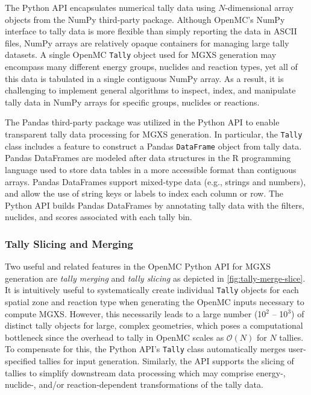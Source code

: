 
The Python API encapsulates numerical tally data using $N$-dimensional array objects from the NumPy third-party package\cite{walt2011numpy}. Although OpenMC's NumPy interface to tally data is more flexible than simply reporting the data in ASCII files, NumPy arrays are relatively opaque containers for managing large tally datasets. A single OpenMC \texttt{Tally} object used for MGXS generation may encompass many different energy groups, nuclides and reaction types, yet all of this data is tabulated in a single contiguous NumPy array. As a result, it is challenging to implement general algorithms to inspect, index, and manipulate tally data in NumPy arrays for specific groups, nuclides or reactions.

The Pandas third-party package\cite{mckinney2010pandas} was utilized in the Python API to enable transparent tally data processing for MGXS generation. In particular, the \texttt{Tally} class includes a feature to construct a Pandas \texttt{DataFrame} object from tally data. Pandas DataFrames are modeled after data structures in the \textsf{R} programming language used to store data tables in a more accessible format than contiguous arrays. Pandas DataFrames support mixed-type data (e.g., strings and numbers), and allow the use of string keys or labels to index each column or row. The Python API builds Pandas DataFrames by annotating tally data with the filters, nuclides, and scores associated with each tally bin.

\subsubsection{Tally Slicing and Merging}
\label{subsubsec:tally-slice-merge}

Two useful and related features in the OpenMC Python API for MGXS generation are \textit{tally merging} and \textit{tally slicing} as depicted in \cref{fig:tally-merge-slice}. It is intuitively useful to systematically create individual \texttt{Tally} objects for each spatial zone and reaction type when generating the OpenMC inputs necessary to compute MGXS. However, this necessarily leads to a large number (10$^2$ -- 10$^3$) of distinct tally objects for large, complex geometries, which poses a computational bottleneck since the overhead to tally in OpenMC scales as $\mathcal{O}(N)$ for $N$ tallies. To compensate for this, the Python API's \texttt{Tally} class automatically merges user-specified tallies for input generation. Similarly, the API supports the slicing of tallies to simplify downstream data processing which may comprise energy-, nuclide-, and/or reaction-dependent transformations of the tally data.

